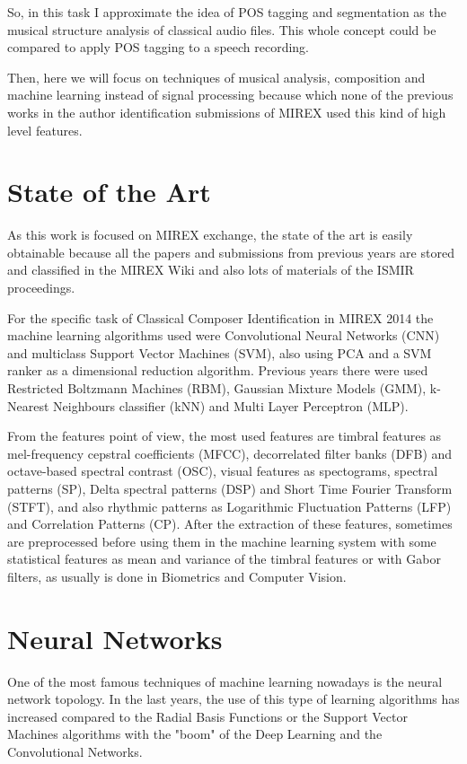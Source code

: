 \documentclass[a4paper,openany,oneside,12pt]{book}
\begin{document}
So, in this task I approximate the idea of POS tagging and segmentation as the musical structure analysis of classical audio files. This whole concept could be compared to apply POS tagging to a speech recording.

Then, here we will focus on techniques of musical analysis, composition and machine learning instead of signal processing  because which none of the previous works in the author identification submissions of MIREX used this kind of high level features.


\section{State of the Art}
As this work is focused on MIREX exchange, the state of the art is easily obtainable because all the papers and submissions from previous years are stored and classified in the MIREX Wiki and also lots of materials of the ISMIR proceedings.

For the specific task of Classical Composer Identification in MIREX 2014 the machine learning algorithms used were Convolutional Neural Networks (CNN) and multiclass Support Vector Machines (SVM), also using PCA and a SVM ranker as a dimensional reduction algorithm. Previous years there were used Restricted Boltzmann Machines (RBM), Gaussian Mixture Models (GMM), k-Nearest Neighbours classifier (kNN) and Multi Layer Perceptron (MLP).

From the features point of view, the most used features are timbral features as mel-frequency cepstral coefficients (MFCC), decorrelated filter banks (DFB) and octave-based spectral contrast (OSC), visual features as spectograms, spectral patterns (SP), Delta spectral patterns (DSP) and Short Time Fourier Transform (STFT), and also rhythmic patterns as Logarithmic Fluctuation Patterns (LFP) and Correlation Patterns (CP). After the extraction of these features, sometimes are preprocessed before using them in the machine learning system with some statistical features as mean and variance of the timbral features or with Gabor filters, as usually is done in Biometrics and Computer Vision.



\section{Neural Networks}

One of the most famous techniques of machine learning nowadays is the neural network topology. In the last years, the use of this type of learning algorithms has increased compared to the Radial Basis Functions or the Support Vector Machines algorithms with the "boom" of the Deep Learning and the Convolutional Networks.
\end{document}
